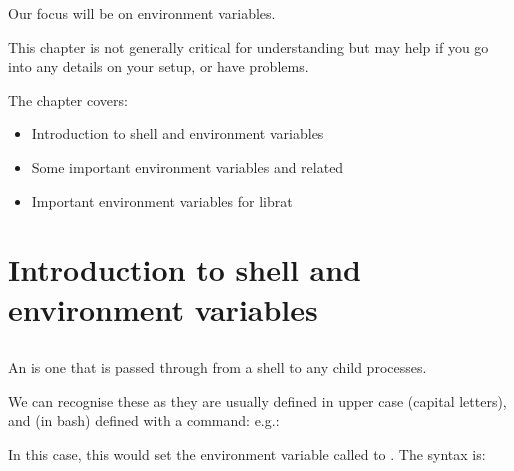 \documentclass[letterpaper,10pt,english]{sphinxmanual}
\begin{document}
Our focus will be on  environment variables.

This chapter is not generally critical for understanding  but may help if you go into any details on your setup, or have problems.

The chapter covers:
\begin{itemize}
\item {} 
Introduction to shell and environment variables

\item {} 
Some important environment variables and related

\item {} 
Important environment variables for librat

\end{itemize}


\section{Introduction to shell and environment variables}
\label{\detokenize{Appendix1:Introduction-to-shell-and-environment-variables}}

\subsection{}
\label{\detokenize{Appendix1:export}}
An  is one that is passed through from a shell to any child processes.

We can recognise these as they are usually defined in upper case (capital letters), and (in bash) defined with a  command: e.g.:

\begin{sphinxVerbatim}[commandchars=\\\{\}]
 
\end{sphinxVerbatim}

In this case, this would set the environment variable called  to . The syntax is:

\begin{sphinxVerbatim}[commandchars=\\\{\}]
 
\end{sphinxVerbatim}
\end{document}
